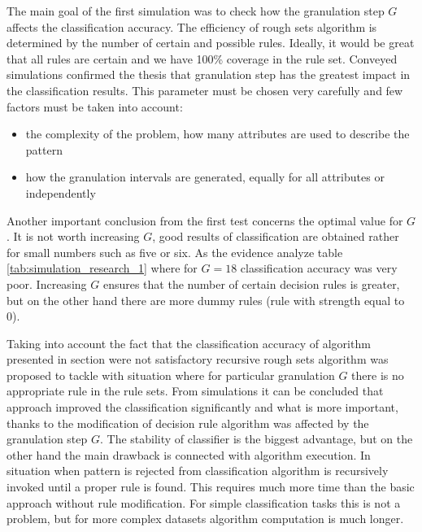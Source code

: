 The main goal of the first simulation was to check how the granulation step $G$
affects the classification accuracy. The efficiency of rough sets algorithm is
determined by the number of certain and possible rules. Ideally, it would be
great that all rules are certain and we have 100\% coverage in the rule set.
Conveyed simulations confirmed the thesis that granulation step has the
greatest impact in the classification results. This parameter must be chosen
very carefully and few factors must be taken into account:
\begin{itemize}
    \item the complexity of the problem, how many attributes are used to
        describe the pattern
    \item how the granulation intervals are generated, equally for all
        attributes or independently
\end{itemize}
Another important conclusion from the first test concerns the optimal value for
$G$. It is not worth increasing $G$, good results of classification are
obtained rather for small numbers such as five or six. As the evidence analyze
table \ref{tab:simulation_research_1} where for $G=18$ classification accuracy
was very poor. Increasing $G$ ensures that the number of certain decision rules
is greater, but on the other hand there are more dummy rules (rule with
strength equal to 0). 

Taking into account the fact that the classification accuracy of algorithm
presented in section \label{cha:Simulation_reaearch_1} were not satisfactory
recursive rough sets algorithm was proposed to tackle with situation where for
particular granulation $G$ there is no appropriate rule in the rule sets. From
simulations it can be concluded that approach improved the classification
significantly and what is more important, thanks to the modification of
decision rule algorithm was affected by the granulation step $G$. The stability
of classifier is the biggest advantage, but on the other hand the main drawback
is connected with algorithm execution. In situation when pattern is rejected
from classification algorithm is recursively invoked until a proper rule is
found. This requires much more time than the basic approach without rule
modification.  For simple classification tasks this is not a problem, but for
more complex datasets algorithm computation is much longer.

